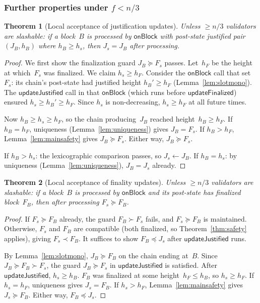 \ifx\litemode\undefined\documentclass{article}\fi
\theoremstyle{plain}
\newtheorem{theorem}{Theorem}
\theoremstyle{definition}
\theoremstyle{remark}
\begin{document}
\subsubsection*{Further properties under $f < n/3$}

\begin{theorem}[Local acceptance of justification updates]\label{thm:justlive}
Unless $\geq n/3$ validators are slashable: if a block~$B$ is processed by $\textsf{onBlock}$ with post-state justified pair $(J_B, h_B)$ where $h_B \geq h_s$, then $J_s = J_B$ after processing.
\end{theorem}

\begin{proof}
We first show the finalization guard $J_B \succeq F_s$ passes.
Let~$h_F$ be the height at which~$F_s$ was finalized.
We claim $h_s \geq h_F$.
Consider the $\textsf{onBlock}$ call that set~$F_s$: its chain's post-state had justified height $h_B' \geq h_F$ (Lemma~\ref{lem:slotmono}).
The $\textsf{updateJustified}$ call in that $\textsf{onBlock}$ (which runs before $\textsf{updateFinalized}$) ensured $h_s \geq h_B' \geq h_F$.
Since $h_s$ is non-decreasing, $h_s \geq h_F$ at all future times.

Now $h_B \geq h_s \geq h_F$, so the chain producing~$J_B$ reached height~$h_B \geq h_F$.
If $h_B = h_F$, uniqueness (Lemma~\ref{lem:uniqueness}) gives $J_B = F_s$.
If $h_B > h_F$, Lemma~\ref{lem:mainsafety} gives $J_B \succeq F_s$.
Either way, $J_B \succeq F_s$.

If $h_B > h_s$: the lexicographic comparison passes, so $J_s \gets J_B$.
If $h_B = h_s$: by uniqueness (Lemma~\ref{lem:uniqueness}), $J_B = J_s$ already.
\end{proof}

\begin{theorem}[Local acceptance of finality updates]\label{thm:finlive}
Unless $\geq n/3$ validators are slashable: if a block~$B$ is processed by $\textsf{onBlock}$ and its post-state has finalized block~$F_B$, then after processing $F_s \succeq F_B$.
\end{theorem}

\begin{proof}
If $F_s \succeq F_B$ already, the guard $F_B \succ F_s$ fails, and $F_s \succeq F_B$ is maintained.
Otherwise, $F_s$ and $F_B$ are compatible (both finalized, so Theorem~\ref{thm:safety} applies), giving $F_s \prec F_B$.
It suffices to show $F_B \preceq J_s$ after $\textsf{updateJustified}$ runs.

By Lemma~\ref{lem:slotmono}, $J_B \succeq F_B$ on the chain ending at~$B$.
Since $J_B \succeq F_B \succ F_s$, the guard $J_B \succeq F_s$ in $\textsf{updateJustified}$ is satisfied.
After $\textsf{updateJustified}$, $h_s \geq h_B$.
$F_B$ was finalized at some height~$h_F \leq h_B$, so $h_s \geq h_F$.
If $h_s = h_F$, uniqueness gives $J_s = F_B$.
If $h_s > h_F$, Lemma~\ref{lem:mainsafety} gives $J_s \succeq F_B$.
Either way, $F_B \preceq J_s$.
\end{proof}
\end{document}
